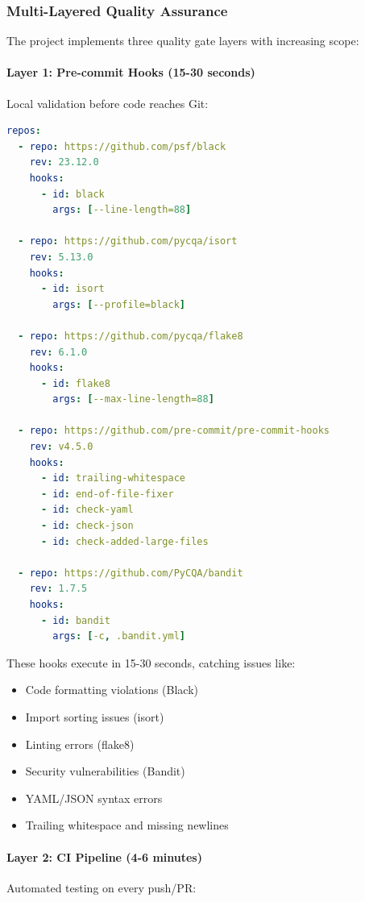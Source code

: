 \subsubsection{Multi-Layered Quality Assurance}

The project implements three quality gate layers with increasing scope:

\paragraph{Layer 1: Pre-commit Hooks (15-30 seconds)}
Local validation before code reaches Git:

\begin{lstlisting}[language=yaml, caption=.pre-commit-config.yaml]
repos:
  - repo: https://github.com/psf/black
    rev: 23.12.0
    hooks:
      - id: black
        args: [--line-length=88]
  
  - repo: https://github.com/pycqa/isort
    rev: 5.13.0
    hooks:
      - id: isort
        args: [--profile=black]
  
  - repo: https://github.com/pycqa/flake8
    rev: 6.1.0
    hooks:
      - id: flake8
        args: [--max-line-length=88]
  
  - repo: https://github.com/pre-commit/pre-commit-hooks
    rev: v4.5.0
    hooks:
      - id: trailing-whitespace
      - id: end-of-file-fixer
      - id: check-yaml
      - id: check-json
      - id: check-added-large-files
  
  - repo: https://github.com/PyCQA/bandit
    rev: 1.7.5
    hooks:
      - id: bandit
        args: [-c, .bandit.yml]
\end{lstlisting}

These hooks execute in 15-30 seconds, catching issues like:
\begin{itemize}
    \item Code formatting violations (Black)
    \item Import sorting issues (isort)
    \item Linting errors (flake8)
    \item Security vulnerabilities (Bandit)
    \item YAML/JSON syntax errors
    \item Trailing whitespace and missing newlines
\end{itemize}

\paragraph{Layer 2: CI Pipeline (4-6 minutes)}
Automated testing on every push/PR:

